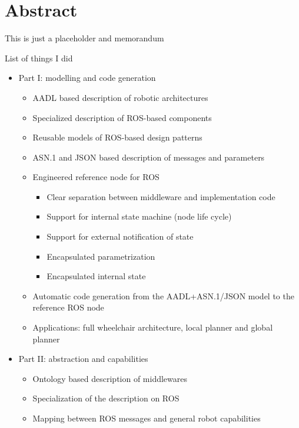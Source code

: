 \begingroup
\let\clearpage\relax
\let\cleardoublepage\relax
\let\cleardoublepage\relax

\chapter*{Abstract}
This is just a placeholder and memorandum

List of things I did
\begin{itemize}
	\item Part I: modelling and code generation
	\begin{itemize}
		\item AADL based description of robotic architectures
		\item Specialized description of ROS-based components
		\item Reusable models of ROS-based design patterns
		\item ASN.1 and JSON based description of messages and parameters
		\item Engineered reference node for ROS
		\begin{itemize}
			\item Clear separation between middleware and implementation code
			\item Support for internal state machine (node life cycle)
			\item Support for external notification of state
			\item Encapsulated parametrization
			\item Encapsulated internal state
		\end{itemize}
		\item Automatic code generation from the AADL+ASN.1/JSON model to the reference ROS node
		\item Applications: full wheelchair architecture, local planner and global planner
	\end{itemize}
	\item Part II: abstraction and capabilities
	\begin{itemize}
		\item Ontology based description of middlewares
		\item Specialization of the description on ROS
		\item Mapping between ROS messages and general robot capabilities

\end{itemize}
\end{itemize}

